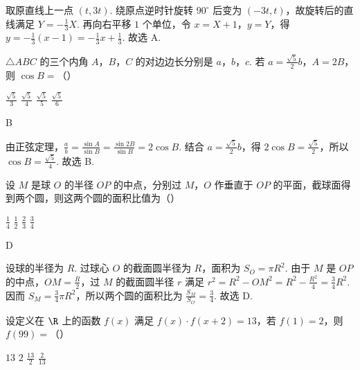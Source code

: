\begin{solution}
取原直线上一点 \(\left(t,3t\right)\). 绕原点逆时针旋转 \(90^{\circ}\) 后变为 \(\left(-3t,t\right)\)，故旋转后的直线满足 \(Y=-\frac13X\). 再向右平移 \(1\) 个单位，令 \(x=X+1\)，\(y=Y\)，得 \(y=-\frac13(x-1)=-\frac13x+\frac13\). 故选 A.
\end{solution}

\begin{problem}
\(\triangle ABC\) 的三个内角 \(A\)，\(B\)，\(C\) 的对边边长分别是 \(a\)，\(b\)，\(c\). 若 \(a = \frac{\sqrt{5}}{2}b\)，\(A = 2B\)，则 \(\cos B =\)（\quad）

\choices
    {\(\frac{\sqrt{5}}{3}\)}
    {\(\frac{\sqrt{5}}{4}\)}
    {\(\frac{\sqrt{5}}{5}\)}
    {\(\frac{\sqrt{5}}{6}\)}
\end{problem}

\begin{answer}
B
\end{answer}

\begin{solution}
由正弦定理，\(\frac{a}{b}=\frac{\sin A}{\sin B}=\frac{\sin 2B}{\sin B}=2\cos B\). 结合 \(a=\frac{\sqrt5}{2}b\)，得 \(2\cos B=\frac{\sqrt5}{2}\)，所以 \(\cos B=\frac{\sqrt5}{4}\). 故选 B.
\end{solution}

\begin{problem}
设 \(M\) 是球 \(O\) 的半径 \(OP\) 的中点，分别过 \(M\)，\(O\) 作垂直于 \(OP\) 的平面，截球面得到两个圆，则这两个圆的面积比值为（\quad）

\choices
    {\(\frac{1}{4}\)}
    {\(\frac{1}{2}\)}
    {\(\frac{2}{3}\)}
    {\(\frac{3}{4}\)}
\end{problem}

\begin{answer}
D
\end{answer}

\begin{solution}
设球的半径为 \(R\). 过球心 \(O\) 的截面圆半径为 \(R\)，面积为 \(S_O=\pi R^{2}\). 由于 \(M\) 是 \(OP\) 的中点，\(OM=\frac{R}{2}\)，过 \(M\) 的截面圆半径 \(r\) 满足 \(r^{2}=R^{2}-OM^{2}=R^{2}-\frac{R^{2}}{4}=\frac34R^{2}\). 因而 \(S_M=\frac34\pi R^{2}\)，所以两个圆的面积比为 \(\frac{S_M}{S_O}=\frac34\). 故选 D.
\end{solution}

\begin{problem}
设定义在 \(\R\) 上的函数 \(f(x)\) 满足 \(f(x) \cdot f(x + 2) = 13\)，若 \(f(1) = 2\)，则 \(f(99) =\)（\quad）

\choices
    {\(13\)}
    {\(2\)}
    {\(\frac{13}{2}\)}
    {\(\frac{2}{13}\)}
\end{problem}

